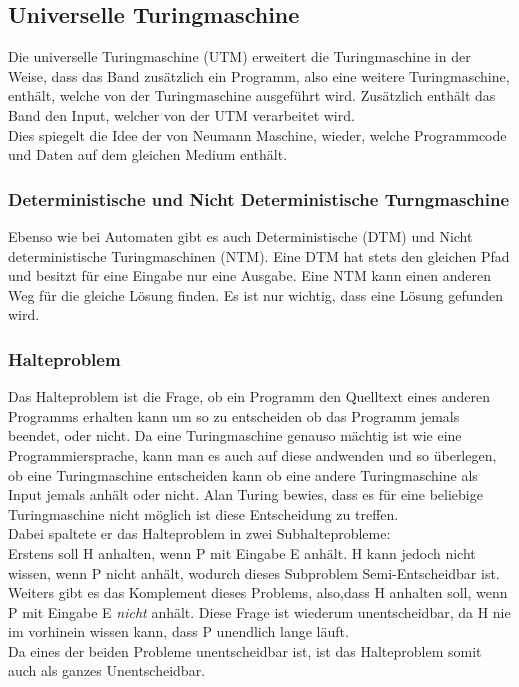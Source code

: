 \documentclass{article}
\begin{document}
	\subsection{Universelle Turingmaschine}
	Die universelle Turingmaschine (UTM) erweitert die Turingmaschine in der Weise, dass das Band zusätzlich ein Programm, also eine weitere Turingmaschine, enthält, welche von der Turingmaschine ausgeführt wird. Zusätzlich enthält das Band den Input, welcher von der UTM verarbeitet wird. \\
	Dies spiegelt die Idee der von Neumann Maschine, wieder, welche Programmcode und Daten auf dem gleichen Medium enthält.
	\subsubsection{Deterministische und Nicht Deterministische Turngmaschine}
	Ebenso wie bei Automaten gibt es auch Deterministische (DTM) und Nicht deterministische Turingmaschinen (NTM). Eine DTM hat stets den gleichen Pfad und besitzt für eine Eingabe nur eine Ausgabe. Eine NTM kann einen anderen Weg für die gleiche Lösung finden. Es ist nur wichtig, dass eine Lösung gefunden wird. \\
	\subsubsection{Halteproblem}
	Das Halteproblem ist die Frage, ob ein Programm den Quelltext eines anderen Programms erhalten kann um so zu entscheiden ob das Programm jemals beendet, oder nicht. Da eine Turingmaschine genauso mächtig ist wie eine Programmiersprache, kann man es auch auf diese andwenden und so überlegen, ob eine Turingmaschine entscheiden kann ob eine andere Turingmaschine als Input jemals anhält oder nicht. Alan Turing bewies, dass es für eine beliebige Turingmaschine nicht möglich ist diese Entscheidung zu treffen. \\
	Dabei spaltete er das Halteproblem in zwei Subhalteprobleme: \\
	Erstens soll H anhalten, wenn P mit Eingabe E anhält. H kann jedoch nicht wissen, wenn P nicht anhält, wodurch dieses Subproblem Semi-Entscheidbar ist. \\
	Weiters gibt es das Komplement dieses Problems, also,dass H anhalten soll, wenn P mit Eingabe E \textit{nicht} anhält. Diese Frage ist wiederum unentscheidbar, da H nie im vorhinein wissen kann, dass P unendlich lange läuft. \\
	Da eines der beiden Probleme unentscheidbar ist, ist das Halteproblem somit auch als ganzes Unentscheidbar.
\end{document}
